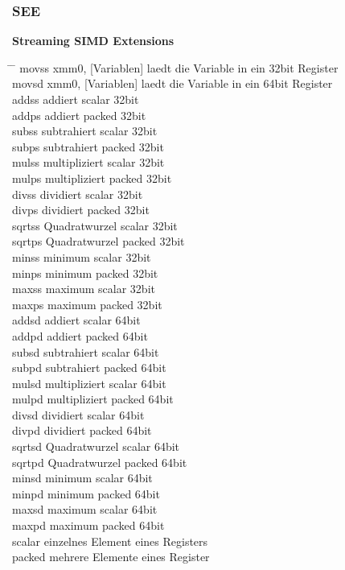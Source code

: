 \documentclass[a4paper,12pt,twoside]{article}
\begin{document}
\subsubsection{SEE}
\textbf{Streaming SIMD Extensions}
\begin{tabbing}
  \hspace{2mm} \= \hspace{50mm} \= \kill
  \> movss xmm0, [Variablen] \>  laedt die Variable in ein 32bit Register \\ 
  \> movsd xmm0, [Variablen] \> laedt die Variable in ein 64bit Register \\ 
  \> addss \> addiert scalar 32bit \\ 
  \> addps \> addiert packed 32bit \\ 
  \> subss \> subtrahiert scalar 32bit \\ 
  \> subps \> subtrahiert packed 32bit \\ 
  \> mulss \> multipliziert scalar 32bit \\ 
  \> mulps \> multipliziert packed 32bit \\ 
  \> divss \> dividiert scalar 32bit \\ 
  \> divps \> dividiert packed 32bit \\ 
  \> sqrtss \> Quadratwurzel scalar 32bit \\ 
  \> sqrtps \> Quadratwurzel packed 32bit \\ 
  \> minss \> minimum scalar 32bit \\ 
  \> minps \> minimum packed 32bit \\ 
  \> maxss \> maximum scalar 32bit \\ 
  \> maxps \> maximum packed 32bit \\ 
  \> addsd \> addiert scalar 64bit \\ 
  \> addpd \> addiert packed 64bit \\ 
  \> subsd \> subtrahiert scalar 64bit \\ 
  \> subpd \> subtrahiert packed 64bit \\ 
  \> mulsd \> multipliziert scalar 64bit \\ 
  \> mulpd \> multipliziert packed 64bit \\ 
  \> divsd \> dividiert scalar 64bit \\ 
  \> divpd \> dividiert packed 64bit \\ 
  \> sqrtsd \> Quadratwurzel scalar 64bit \\ 
  \> sqrtpd \> Quadratwurzel packed 64bit \\ 
  \> minsd \> minimum scalar 64bit \\ 
  \> minpd \> minimum packed 64bit \\ 
  \> maxsd \> maximum scalar 64bit \\ 
  \> maxpd \> maximum packed 64bit \\ 
  \> scalar \> einzelnes Element eines Registers \\ 
  \> packed \> mehrere Elemente eines Register \\ 
\end{tabbing}
\end{document}
